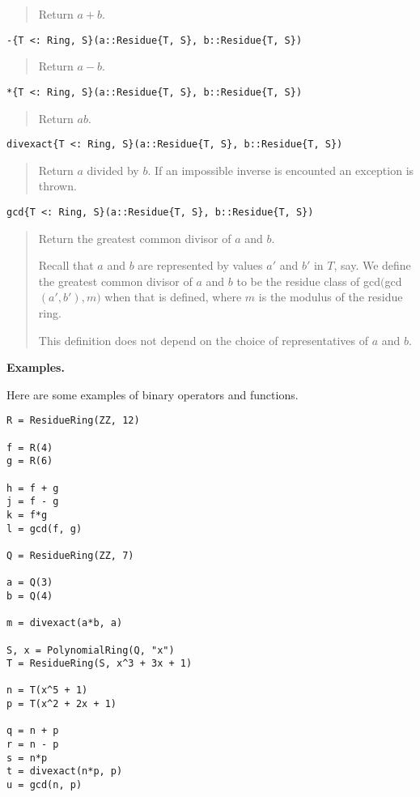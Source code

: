 \documentclass[a4paper,10pt]{article}
\newcommand{\desc}[1]{\vspace{-3mm}\begin{quote}#1\end{quote}}
\begin{document}
{{{\desc{Return $a + b$.}

\begin{lstlisting}
-{T <: Ring, S}(a::Residue{T, S}, b::Residue{T, S})
\end{lstlisting}

\desc{Return $a - b$.}

\begin{lstlisting}
*{T <: Ring, S}(a::Residue{T, S}, b::Residue{T, S})
\end{lstlisting}

\desc{Return $ab$.}

\begin{lstlisting}
divexact{T <: Ring, S}(a::Residue{T, S}, b::Residue{T, S})
\end{lstlisting}

\desc{Return $a$ divided by $b$. If an impossible inverse is encounted
an exception is thrown.}

\begin{lstlisting}
gcd{T <: Ring, S}(a::Residue{T, S}, b::Residue{T, S})
\end{lstlisting}

\desc{Return the greatest common divisor of $a$ and $b$. 

Recall that $a$ and $b$ are represented by values $a'$ and $b'$ in $T$, 
say. We define the greatest common divisor of $a$ and $b$ to be the 
residue class of gcd$($gcd$(a', b'), m)$ when that is defined, where 
$m$ is the modulus of the residue ring.

This definition does not depend on the choice of representatives of
$a$ and $b$.}

\textbf{Examples.}

Here are some examples of binary operators and functions.

\begin{lstlisting}
R = ResidueRing(ZZ, 12)

f = R(4)
g = R(6)

h = f + g
j = f - g
k = f*g
l = gcd(f, g)

Q = ResidueRing(ZZ, 7)

a = Q(3)
b = Q(4)

m = divexact(a*b, a)

S, x = PolynomialRing(Q, "x")
T = ResidueRing(S, x^3 + 3x + 1)

n = T(x^5 + 1)
p = T(x^2 + 2x + 1)

q = n + p
r = n - p
s = n*p
t = divexact(n*p, p)
u = gcd(n, p)
\end{lstlisting}

}}}
\end{document}
